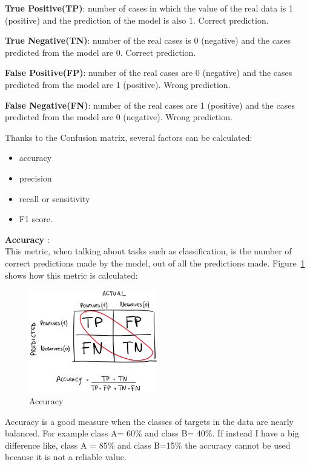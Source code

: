 \textbf{True Positive(TP)}: number of cases in which the value of the real data is 1 (positive) and the prediction of the model is also 1. Correct prediction.

\textbf{True Negative(TN)}: number of the real cases is 0 (negative) and the cases predicted from the model are 0. Correct prediction.

\textbf{False Positive(FP)}: number of the real cases are 0 (negative) and the cases predicted from the model are 1 (positive). Wrong prediction. 

\textbf{False Negative(FN)}: number of the real cases are 1 (positive) and the cases predicted from the model are 0 (negative). Wrong prediction. 

Thanks to the \gls{Confusion matrix}, several factors can be calculated:
\begin{itemize}
    \item \gls{accuracy}
    \item precision
    \item \gls{recall} or sensitivity
    \item \gls{F1 score}.
\end{itemize}

\textbf{Accuracy} \cite{brownlee_how_2020}:\\
This metric, when talking about tasks such as classification, is the number of correct predictions made by the model, out of all the predictions made.
Figure~\ref{fig:fig_acc} shows how this metric is calculated:
\begin{figure}[ht!]
\centering
\includegraphics[width=0.5\textwidth]{images/acc.png}
\caption{Accuracy}
\label{fig:fig_acc}
\end{figure}
\FloatBarrier

Accuracy is a good measure when the classes of targets in the data are nearly balanced. 
For example class A= 60\% and class B= 40\%. 
If instead I have a big difference like, class A = 85\% and class B=15\% the \gls{accuracy} cannot be used because it is not a reliable value.

